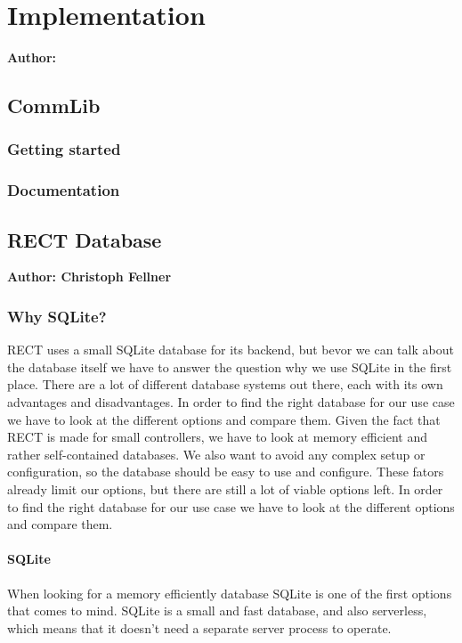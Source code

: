 \chapter{Implementation}

\textbf{Author: } 

\section{CommLib}
\subsection{Getting started}



\subsection{Documentation}

\section{RECT Database}
\textbf{Author: Christoph Fellner}

\subsection{Why SQLite?}
RECT uses a small SQLite database for its backend, but bevor we can talk about the database itself we have to answer the question why we use SQLite in the first place. 
There are a lot of different database systems out there, each with its own advantages and disadvantages. In order to find the right database for our use case we have to 
look at the different options and compare them. Given the fact that RECT is made for small controllers, we have to look at memory efficient and rather self-contained 
databases. We also want to avoid any complex setup or configuration, so the database should be easy to use and configure. These fators already limit our options, but there 
are still a lot of viable options left. In order to find the right database for our use case we have to look at the different options and compare them. 

\subsubsection{SQLite}
When looking for a memory efficiently database SQLite is one of the first options that comes to mind. SQLite is a small and fast database, and also serverless, 
which means that it doesn't need a separate server process to operate. 

